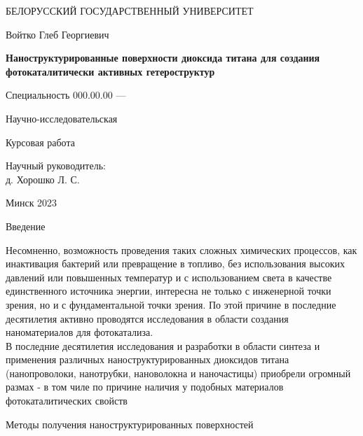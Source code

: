 \documentclass[oneside,final,12pt]{extreport}
\begin{document}

\centerline{БЕЛОРУССКИЙ  ГОСУДАРСТВЕННЫЙ УНИВЕРСИТЕТ}

\vfill
\vfill
\vfill
\large
\centerline{Войтко Глеб Георгиевич}
\vfill
\Large
\begin{center}
{\bf Наноструктурированные поверхности  диоксида титана для создания фотокаталитически активных гетероструктур}
\end{center}
\normalsize
\vfill
\centerline{Специальность 000.00.00 --- }
\centerline{Научно-исследовательская}
\vfill
\centerline{Курсовая работа}
\vfill
\vfill
\begin{flushright}
Научный руководитель:\\
д. Хорошко Л. С.
\end{flushright}
\vfill
\vfill
\centerline{Минск 2023}
\thispagestyle{empty}


\tableofcontents

\begin{chapter} {Введение}

Несомненно, возможность проведения таких сложных химических процессов, как инактивация бактерий или превращение  в топливо, без использования высоких давлений или повышенных температур и с использованием света в качестве единственного источника энергии, интересна не только с инженерной точки зрения, но и с фундаментальной точки зрения. По этой причине в последние десятилетия активно проводятся исследования в области создания наноматериалов для фотокатализа. \\

В последние десятилетия исследования и разработки в области синтеза и применения различных наноструктурированных диоксидов титана (нанопроволоки, нанотрубки, нановолокна и наночастицы) приобрели огромный размах - в том чиле по причине наличия у подобных материалов фотокаталитических свойств
\end{chapter}
	
\begin{chapter} {Методы получения наноструктурированных поверхностей }



\end{chapter}

\end{document}
